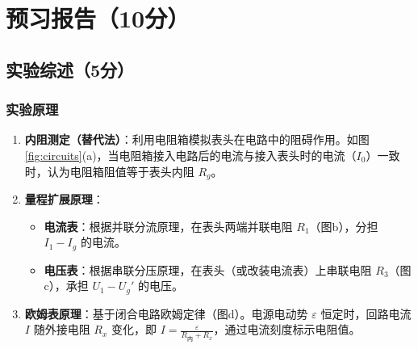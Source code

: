 \documentclass{../template/Report}%
\begin{document}
\maketitle%

\section{预习报告（10分）}
\subsection{实验综述（5分）}
\subsubsection{实验原理}
\begin{enumerate}
    \item \textbf{内阻测定（替代法）}：利用电阻箱模拟表头在电路中的阻碍作用。如图\ref{fig:circuits}(a)，当电阻箱接入电路后的电流与接入表头时的电流（$I_0$）一致时，认为电阻箱阻值等于表头内阻 $R_g$。
    \item \textbf{量程扩展原理}：
          \begin{itemize}
              \item \textbf{电流表}：根据并联分流原理，在表头两端并联电阻 $R_1$（图b），分担 $I_1 - I_g$ 的电流。
              \item \textbf{电压表}：根据串联分压原理，在表头（或改装电流表）上串联电阻 $R_3$（图c），承担 $U_1 - U_g'$ 的电压。
          \end{itemize}
    \item \textbf{欧姆表原理}：基于闭合电路欧姆定律（图d）。电源电动势 $\varepsilon$ 恒定时，回路电流 $I$ 随外接电阻 $R_x$ 变化，即 $I = \frac{\varepsilon}{R_{\text{内}} + R_x}$，通过电流刻度标示电阻值。
\end{enumerate}
\end{document}

